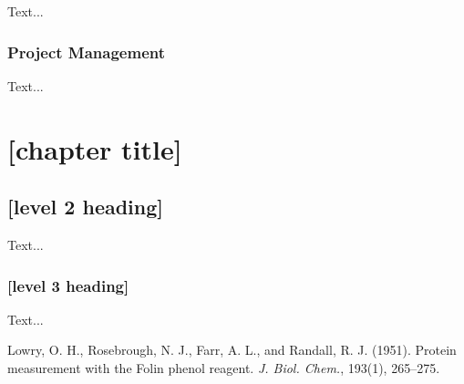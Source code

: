 \documentclass[12pt,a4paper]{report}
\begin{document}
Text...


\subsection{Project Management}


Text...


\chapter{[chapter title]}

\section{[level 2 heading]}

Text...

\subsection{[level 3 heading]}

Text...


\renewcommand{\bibname}{REFERENCES}





\begin{thebibliography}{10}


Lowry, O. H., Rosebrough, N. J., Farr, A. L., and Randall, R. J. (1951). Protein measurement with the Folin phenol reagent. \emph{J. Biol. Chem.}, 193(1), 265--275.

\end{thebibliography}
\end{document}
